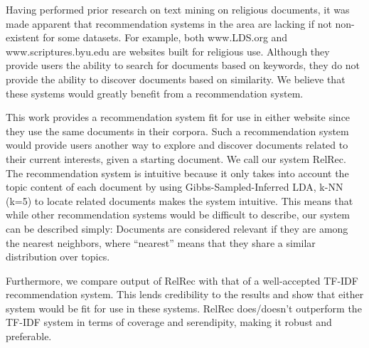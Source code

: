 
Having performed prior research on text mining on religious documents, it was made apparent that recommendation systems in the area are lacking if not non-existent for some datasets. For example, both www.LDS.org and www.scriptures.byu.edu are websites built for religious use. Although they provide users the ability to search for documents based on keywords, they do not provide the ability to discover documents based on similarity. We believe that these systems would greatly benefit from a recommendation system.

This work provides a recommendation system fit for use in either website since they use the same documents in their corpora. Such a recommendation system would provide users another way to explore and discover documents related to their current interests, given a starting document. We call our system RelRec. The recommendation system is intuitive because it only takes into account the topic content of each document by using Gibbs-Sampled-Inferred LDA, k-NN (k=5) to locate related documents makes the system intuitive. This means that while other recommendation systems would be difficult to describe, our system can be described simply: Documents are considered relevant if they are among the nearest neighbors, where “nearest” means that they share a similar distribution over topics.

Furthermore, we compare output of RelRec with that of a well-accepted TF-IDF recommendation system. This lends credibility to the results and show that either system would be fit for use in these systems. RelRec does/doesn’t outperform the TF-IDF system in terms of coverage and serendipity, making it robust and preferable.
